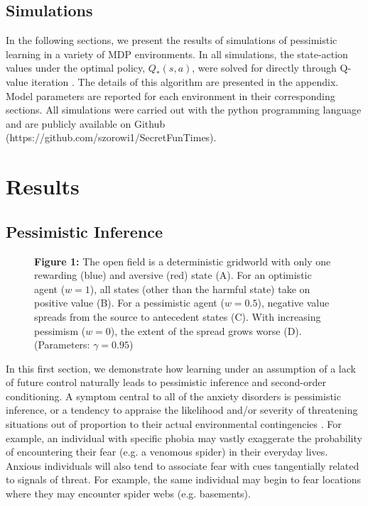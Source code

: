 \documentclass[11pt]{article} %
\begin{document}
\subsection{Simulations}

In the following sections, we present the results of simulations of pessimistic
learning in a variety of MDP environments. In all simulations, the state-action
values under the optimal policy, $Q_*(s,a)$, were solved for directly through
Q-value iteration \citep{SuttonBarto1998,SuttonBarto1998,bertsekas2005}. The
details of this algorithm are presented in the appendix. Model parameters are
reported for each environment in their corresponding sections. All simulations
were carried out with the python programming language and are publicly available
on Github (https://github.com/szorowi1/SecretFunTimes).

\section{Results}

\subsection{Pessimistic Inference}

\begin{figure}
  \centerline{%
  }
  \par \textbf{Figure 1:} The open field is a deterministic gridworld with only one rewarding
  (blue) and aversive (red) state (A). For an optimistic agent ($w=1$), all states (other than
  the harmful state) take on positive value (B). For a pessimistic agent ($w=0.5$), negative value spreads
  from the source to antecedent states (C). With increasing pessimism ($w=0$), the extent of the spread
  grows worse (D). (Parameters: $\gamma = 0.95$)
\end{figure}

In this first section, we demonstrate how learning under an assumption of a lack
of future control naturally leads to pessimistic inference and second-order conditioning.
A symptom central to all of the anxiety disorders is pessimistic inference,
or a tendency to appraise the likelihood and/or severity of threatening situations
out of proportion to their actual environmental contingencies \citep{dsm5, BeckClark1997,
ClarkBeck2011}. For example, an individual with specific phobia may vastly exaggerate
the probability of encountering their fear (e.g. a venomous spider) in their
everyday lives. Anxious individuals will also tend to associate fear with cues
tangentially related to signals of threat. For example, the same individual may
begin to fear locations where they may encounter spider webs (e.g. basements).
\end{document}
